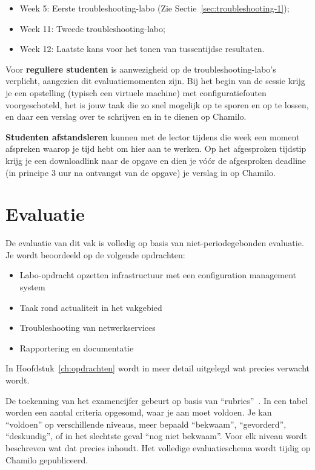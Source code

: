 \begin{itemize}
  \item Week 5: Eerste troubleshooting-labo (Zie Sectie~\ref{sec:troubleshooting-1});
  \item Week 11: Tweede troubleshooting-labo;
  \item Week 12: Laatste kans voor het tonen van tussentijdse resultaten.
\end{itemize}

Voor \textbf{reguliere studenten} is aanwezigheid op de troubleshooting-labo's verplicht, aangezien dit evaluatiemomenten zijn. Bij het begin van de sessie krijg je een opstelling (typisch een virtuele machine) met configuratiefouten voorgeschoteld, het is jouw taak die zo snel mogelijk op te sporen en op te lossen, en daar een verslag over te schrijven en in te dienen op Chamilo.

\textbf{Studenten afstandsleren} kunnen met de lector tijdens die week een moment afspreken waarop je tijd hebt om hier aan te werken. Op het afgesproken tijdstip krijg je een downloadlink naar de opgave en dien je vóór de afgesproken deadline (in principe 3 uur na ontvangst van de opgave) je verslag in op Chamilo.


\section{Evaluatie}
\label{sec:evaluatie}

De evaluatie van dit vak is volledig op basis van niet-periodegebonden evaluatie. Je wordt beoordeeld op de volgende opdrachten:

\begin{itemize}
  \item Labo-opdracht opzetten infrastructuur met een configuration management system
  \item Taak rond actualiteit in het vakgebied
  \item Troubleshooting van netwerkservices
  \item Rapportering en documentatie
\end{itemize}

In Hoofdstuk~\ref{ch:opdrachten} wordt in meer detail uitgelegd wat precies verwacht wordt.

De toekenning van het examencijfer gebeurt op basis van ``rubrics''~\autocite{Andrade2000}. In een tabel worden een aantal criteria opgesomd, waar je aan moet voldoen. Je kan ``voldoen'' op verschillende niveaus, meer bepaald ``bekwaam'', ``gevorderd'', ``deskundig'', of in het slechtste geval ``nog niet bekwaam''. Voor elk niveau wordt beschreven wat dat precies inhoudt. Het volledige evaluatieschema wordt tijdig op Chamilo gepubliceerd.

